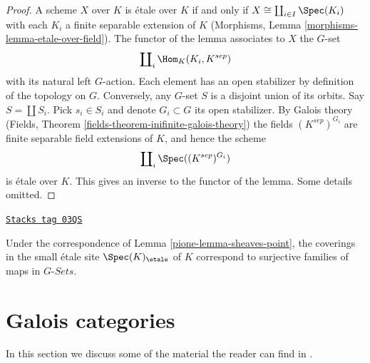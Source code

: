 \begin{proof}
A scheme $X$ over $K$ is \'etale over $K$ if and only if
$X \cong \coprod_{i\in I} \Spec(K_i)$ with
each $K_i$ a finite separable extension of $K$
(Morphisms, Lemma \ref{morphisms-lemma-etale-over-field}).
The functor of the lemma associates to $X$ the $G$-set
$$
\coprod\nolimits_i \Hom_K(K_i, K^{sep})
$$
with its natural left $G$-action. Each element has an open stabilizer
by definition of the topology on $G$. Conversely, any $G$-set $S$
is a disjoint union of its orbits. Say $S = \coprod S_i$. Pick $s_i \in S_i$
and denote $G_i \subset G$ its open stabilizer. By Galois theory
(Fields, Theorem \ref{fields-theorem-inifinite-galois-theory})
the fields $(K^{sep})^{G_i}$ are finite separable field extensions of $K$, and
hence the scheme
$$
\coprod\nolimits_i \Spec((K^{sep})^{G_i})
$$
is \'etale over $K$. This gives an inverse to the functor of the lemma.
Some details omitted.
\end{proof}

\begin{remark}
\label{pione-remark-covering-surjective}
\href{https://stacks.math.columbia.edu/tag/03QS}{\texttt{Stacks tag 03QS}}

Under the correspondence of Lemma \ref{pione-lemma-sheaves-point},
the coverings in the small \'etale site
$\Spec(K)_\etale$ of $K$ correspond to surjective families of
maps in $G\textit{-Sets}$.
\end{remark}

\section{Galois categories}
\label{pione-section-galois}
In this section we discuss some of the material the reader can
find in \cite[Expos\'e V, Sections 4, 5, and 6]{SGA1}.

